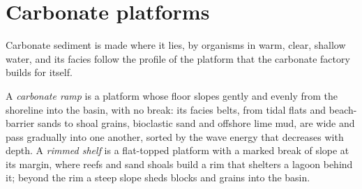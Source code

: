 \section{Carbonate platforms}\label{sec:b3:facies-models:carbonates}

Carbonate sediment is made where it lies, by organisms in warm, clear,
shallow water, and its facies follow the profile of the platform that the
carbonate factory builds for itself.

\begin{definition}\label{def:b3:facies-models:ramp}
A \emph{carbonate ramp} is a platform whose floor
slopes gently and evenly from the shoreline into the basin, with no break:
its facies belts, from tidal flats and beach-barrier sands to shoal grains,
bioclastic sand and offshore lime mud, are wide and pass gradually into one
another, sorted by the wave energy that decreases with depth. A \emph{rimmed
shelf} is a flat-topped platform with a marked break of
slope at its margin, where reefs and sand shoals build a rim that shelters a
lagoon behind it; beyond the rim a steep slope sheds blocks and grains into
the basin.
\end{definition}


